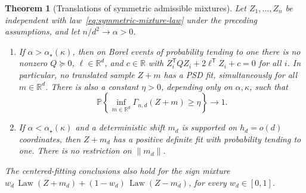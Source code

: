 \documentclass[11pt]{article}
\newcommand{\R}{\mathbb R}
\newcommand{\Pbb}{\mathbb P}
\newcommand{\norm}[1]{\lVert#1\rVert}
\newtheorem{theorem}{Theorem}[section]
\theoremstyle{remark}
\begin{document}
\begin{theorem}[Translations of symmetric admissible mixtures]
\label{thm:symmetric-mixtures}
Let $Z_1,\ldots,Z_n$ be independent with law~\eqref{eq:symmetric-mixture-law}
under the preceding assumptions, and let $n/d^2\to\alpha>0$.
\begin{enumerate}
\item If $\alpha>\alpha_\star(\kappa)$, then on Borel events of
      probability tending to one there is no nonzero $Q\succeq0$,
      $\ell\in\R^d$, and $c\in\R$ with
      $Z_i^{\mathsf T}QZ_i+2\ell^{\mathsf T}Z_i+c=0$ for all $i$.
      In particular, no translated sample $Z+m$ has a PSD fit,
      simultaneously for all $m\in\R^d$. There is also a constant
      $\eta>0$, depending only on $\alpha,\kappa$, such that
      \[
       \Pbb\left\{\inf_{m\in\R^d}\Gamma_{n,d}(Z+m)\ge\eta\right\}
       \longrightarrow1.
      \]
\item If $\alpha<\alpha_\star(\kappa)$ and a deterministic shift $m_d$
      is supported on $h_d=o(d)$ coordinates, then $Z+m_d$ has a
      positive definite fit with probability tending to one.
      There is no restriction on $\norm{m_d}$.
\end{enumerate}
The centered-fitting conclusions also hold for the sign mixture
$w_d\,\operatorname{Law}(Z+m_d)+(1-w_d)\,\operatorname{Law}(Z-m_d)$, for every
$w_d\in[0,1]$.
\end{theorem}
\end{document}
